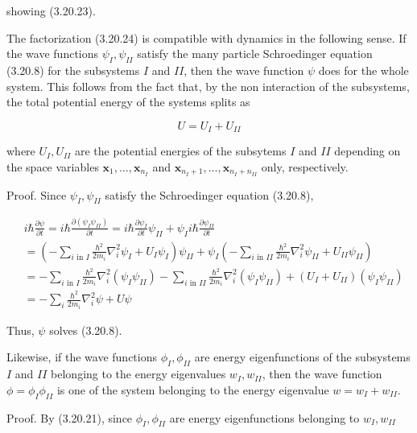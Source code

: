 \documentclass{article}
\begin{document}
showing (3.20.23).

The factorization (3.20.24) is compatible with dynamics in the following sense. If the wave functions $\psi_{I}, \psi_{I I}$ satisfy the many particle Schroedinger equation (3.20.8) for the subsystems $I$ and $I I$, then the wave function $\psi$ does for the whole system. This follows from the fact that, by the non interaction of the subsystems,
the total potential energy of the systems splits as
 
\begin{equation*}
U=U_{I}+U_{I I} \tag{3.20.27}
\end{equation*}
 
where $U_{I}, U_{I I}$ are the potential energies of the subsytems $I$ and $I I$ depending on the space variables $\boldsymbol{x}_{1}, \ldots, \boldsymbol{x}_{n_{I}}$ and $\boldsymbol{x}_{n_{I}+1}, \ldots, \boldsymbol{x}_{n_{I}+n_{I I}}$ only, respectively.

Proof. Since $\psi_{I}, \psi_{I I}$ satisfy the Schroedinger equation (3.20.8),
 
\begin{align*}
& i \hbar \frac{\partial \psi}{\partial t}=i \hbar \frac{\partial\left(\psi_{I} \psi_{I I}\right)}{\partial t}=i \hbar \frac{\partial \psi_{I}}{\partial t} \psi_{I I}+\psi_{I} i \hbar \frac{\partial \psi_{I I}}{\partial t}  \tag{3.20.28}\\
& =\left(-\sum_{i \text { in } I} \frac{\hbar^{2}}{2 m_{i}} \nabla_{i}^{2} \psi_{I}+U_{I} \psi_{I}\right) \psi_{I I}+\psi_{I}\left(-\sum_{i \text { in } I I} \frac{\hbar^{2}}{2 m_{i}} \nabla_{i}^{2} \psi_{I I}+U_{I I} \psi_{I I}\right) \\
& =-\sum_{i \text { in } I} \frac{\hbar^{2}}{2 m_{i}} \nabla_{i}^{2}\left(\psi_{I} \psi_{I I}\right)-\sum_{i \text { in } I I} \frac{\hbar^{2}}{2 m_{i}} \nabla_{i}^{2}\left(\psi_{I} \psi_{I I}\right)+\left(U_{I}+U_{I I}\right)\left(\psi_{I} \psi_{I I}\right) \\
& =-\sum_{i} \frac{\hbar^{2}}{2 m_{i}} \nabla_{i}^{2} \psi+U \psi
\end{align*}
 

Thus, $\psi$ solves (3.20.8).

Likewise, if the wave functions $\phi_{I}, \phi_{I I}$ are energy eigenfunctions of the subsystems $I$ and $I I$ belonging to the energy eigenvalues $w_{I}, w_{I I}$, then the wave function $\phi=\phi_{I} \phi_{I I}$ is one of the system belonging to the energy eigenvalue $w=w_{I}+w_{I I}$.

Proof. By (3.20.21), since $\phi_{I}, \phi_{I I}$ are energy eigenfunctions belonging to $w_{I}, w_{I I}$
 
\end{document}
